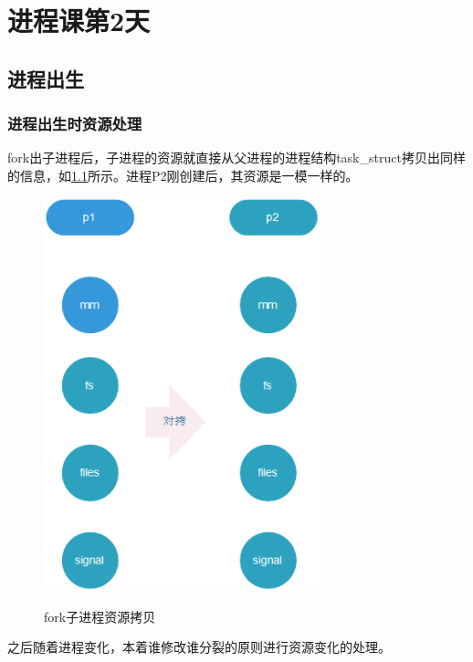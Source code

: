 


\part{进程课第2天}

\chapter{进程出生}
\section{进程出生时资源处理}
fork出子进程后，子进程的资源就直接从父进程的进程结构task\_struct拷贝出同样的信息，如\ref{child_fork_task_struct}所示。进程P2刚创建后，其资源是一模一样的。

\begin{figure}[H]
 \wdfigbox
  {\caption{fork子进程资源拷贝}\label{child_fork_task_struct}}
  {
  \includegraphics[width=8cm]{./figure/child_fork_task_struct.png}
  }
\end{figure}
之后随着进程变化，本着谁修改谁分裂的原则进行资源变化的处理。

